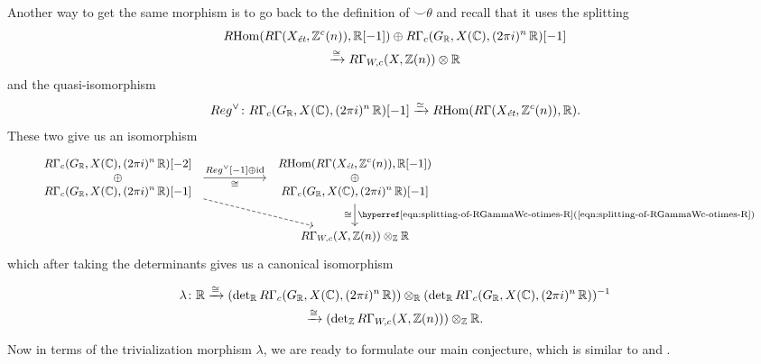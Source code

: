 Another way to get the same morphism is to go back to the definition of
$\smile\theta$ and recall that it uses the splitting
\begin{multline}
  \label{eqn:splitting-of-RGammaWc-otimes-R}
  R\!\operatorname{Hom} (R\Gamma (X_\text{\it ét}, \mathbb{Z}^c (n)), \mathbb{R} [-1])
  \oplus
  R\Gamma_c (G_{\mathbb{R}}, X (\mathbb{C}), (2\pi i)^n\,\mathbb{R}) [-1] \\
  \xrightarrow{\cong} R\Gamma_{W,c} (X,\mathbb{Z} (n)) \otimes \mathbb{R}
\end{multline}
and the quasi-isomorphism
\[ Reg^\vee\colon R\Gamma_c (G_{\mathbb{R}}, X (\mathbb{C}), (2\pi i)^n\,\mathbb{R}) [-1]
  \xrightarrow{\simeq}
  R\!\operatorname{Hom} (R\Gamma (X_\text{\it ét}, \mathbb{Z}^c (n)), \mathbb{R}). \]
These two give us an isomorphism
\begin{equation}
  \label{eqn:trivialization-of-RGammaWc-via-Reg-vee}
  \begin{tikzcd}[column sep=5em,font=\small]
    {\begin{array}{c} R\Gamma_c (G_\RR, X (\CC), (2\pi i)^n\,\RR) [-2] \\ \oplus \\ R\Gamma_c (G_\RR, X (\CC), (2\pi i)^n\,\RR) [-1] \end{array}} \ar{r}{Reg^\vee [-1]\oplus\idid}[swap]{\isom}\ar[dashed]{dr} & {\begin{array}{c} \RHom (R\Gamma (X_\text{\it ét}, \ZZ^c (n)), \RR [-1]) \\ \oplus \\ R\Gamma_c (G_\RR, X (\CC), (2\pi i)^n\,\RR) [-1] \end{array}} \ar{d}{\text{\eqnref{eqn:splitting-of-RGammaWc-otimes-R}}}[swap]{\isom} \\
    & R\Gamma_{W,c} (X,\ZZ (n)) \otimes_\ZZ \RR
  \end{tikzcd}
\end{equation}
which after taking the determinants gives us a canonical isomorphism

\begin{multline}
  \lambda\colon \mathbb{R} \xrightarrow{\cong}
  (\det\nolimits_{\mathbb{R}} R\Gamma_c (G_{\mathbb{R}}, X (\mathbb{C}), (2\pi i)^n\,\mathbb{R}))
  \otimes_{\mathbb{R}}
  (\det\nolimits_{\mathbb{R}} R\Gamma_c (G_{\mathbb{R}}, X (\mathbb{C}), (2\pi i)^n\,\mathbb{R}))^{-1} \\
  \xrightarrow{\cong}
  (\det\nolimits_{\mathbb{Z}} R\Gamma_{W,c} (X,\mathbb{Z} (n))) \otimes_{\mathbb{Z}} \mathbb{R}.
\end{multline}

Now in terms of the trivialization morphism $\lambda$, we are ready to formulate
our main conjecture, which is similar to \cite[Conjecture 4.2]{Morin-14} and
\cite[Conjecture 5.12, 5.13]{Flach-Morin-16}.

